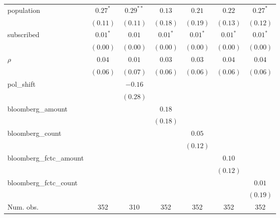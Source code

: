 \begin{table}[!h]
\begin{center}
\begin{tabular}{l c c c c c c }
population              & $0.27^{*}$   & $0.29^{**}$  & $0.13$       & $0.21$       & $0.22$       & $0.27^{*}$   \\
                        & $(0.11)$     & $(0.11)$     & $(0.18)$     & $(0.19)$     & $(0.13)$     & $(0.12)$     \\
subscribed              & $0.01^{*}$   & $0.01$       & $0.01^{*}$   & $0.01^{*}$   & $0.01^{*}$   & $0.01^{*}$   \\
                        & $(0.00)$     & $(0.00)$     & $(0.00)$     & $(0.00)$     & $(0.00)$     & $(0.00)$     \\
$\rho$                  & $0.04$       & $0.01$       & $0.03$       & $0.03$       & $0.04$       & $0.04$       \\
                        & $(0.06)$     & $(0.07)$     & $(0.06)$     & $(0.06)$     & $(0.06)$     & $(0.06)$     \\
pol\_shift              &              & $-0.16$      &              &              &              &              \\
                        &              & $(0.28)$     &              &              &              &              \\
bloomberg\_amount       &              &              & $0.18$       &              &              &              \\
                        &              &              & $(0.18)$     &              &              &              \\
bloomberg\_count        &              &              &              & $0.05$       &              &              \\
                        &              &              &              & $(0.12)$     &              &              \\
bloomberg\_fctc\_amount &              &              &              &              & $0.10$       &              \\
                        &              &              &              &              & $(0.12)$     &              \\
bloomberg\_fctc\_count  &              &              &              &              &              & $0.01$       \\
                        &              &              &              &              &              & $(0.19)$     \\
\midrule
Num. obs.               & 352          & 310          & 352          & 352          & 352          & 352          \\

\end{tabular}
\end{center}
\end{table}
